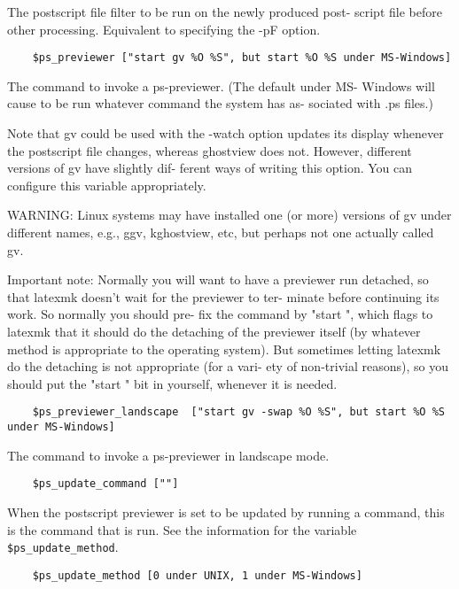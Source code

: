 The postscript file filter to be run on the newly produced post-
script file before other processing.  Equivalent  to  specifying
the -pF option.

\begin{verbatim}
	$ps_previewer ["start gv %O %S", but start %O %S under MS-Windows]
\end{verbatim}

The  command  to  invoke a ps-previewer.  (The default under MS-
Windows will cause to be run whatever command the system has as-
sociated with .ps files.)

Note  that  gv  could be used with the -watch option updates its
display whenever the postscript file changes, whereas  ghostview
does  not.  However, different versions of gv have slightly dif-
ferent ways of writing this  option.   You  can  configure  this
variable appropriately.

WARNING: Linux systems may have installed one (or more) versions
of gv under different names, e.g.,  ggv,  kghostview,  etc,  but
perhaps not one actually called gv.

Important  note:  Normally you will want to have a previewer run
detached, so that latexmk doesn't wait for the previewer to ter-
minate  before continuing its work.  So normally you should pre-
fix the command by "start ", which  flags  to  latexmk  that  it
should  do  the  detaching  of the previewer itself (by whatever
method is appropriate to the operating system).   But  sometimes
letting latexmk do the detaching is not appropriate (for a vari-
ety of non-trivial reasons), so you should put the "start "  bit
in yourself, whenever it is needed.

\begin{verbatim}
	$ps_previewer_landscape  ["start gv -swap %O %S", but start %O %S under MS-Windows]
\end{verbatim}

The command to invoke a ps-previewer in landscape mode.

\begin{verbatim}
	$ps_update_command [""]
\end{verbatim}

When the postscript previewer is set to be updated by running  a
command,  this  is the command that is run.  See the information
for the variable \verb|$ps_update_method|.

\begin{verbatim}
	$ps_update_method [0 under UNIX, 1 under MS-Windows]
\end{verbatim}

